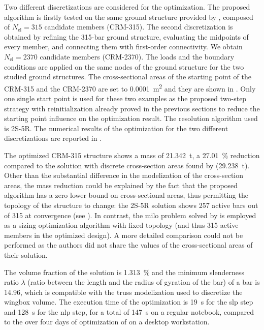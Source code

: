     Two different discretizations are considered for the optimization. The proposed algorithm is firstly tested on the same ground structure provided by \cite{fakhimi_discrete_2021}, composed of $N_{\text{el}}=315$ candidate members (CRM-315). The second discretization is obtained by refining the 315-bar ground structure, evaluating the midpoints of every member, and connecting them with first-order connectivity. We obtain $N_{\text{el}}=2370$ candidate members (CRM-2370). The loads and the boundary conditions are applied on the same nodes of the ground structure for the two studied ground structures. The cross-sectional areas of the starting point of the CRM-315 and the CRM-2370 are set to \qty{0.0001}{m^2} and they are shown in . Only one single start point is used for these two examples as the proposed two-step strategy with reinitialization already proved in the previous sections to reduce the starting point influence on the optimization result. The resolution algorithm used is 2S-5R. The numerical results of the optimization for the two different discretizations are reported in . 
    
    The optimized CRM-315 structure shows a mass of \qty{21.342}{\tonne}, a \qty{27.01}{\%} reduction compared to the solution with discrete cross-section areas found by \cite{fakhimi_discrete_2021}  (\qty{29.238}{\tonne}). Other than the substantial difference in the modelization of the cross-section areas, the mass reduction could be explained by the fact that the proposed algorithm has a zero lower bound on cross-sectional areas, thus permitting the topology of the structure to change: the 2S-5R solution shows 257 active bars out of 315 at convergence (see ). In contrast, the \gls{milo} problem solved by \cite{fakhimi_discrete_2021} is employed as a sizing optimization algorithm with fixed topology (and thus 315 active members in the optimized design). A more detailed comparison could not be performed as the authors did not share the values of the cross-sectional areas of their solution. 
    
    The volume fraction of the solution is \qty{1.313}{\percent} and the minimum slenderness ratio $\lambda$ (ratio between the length and the radius of gyration of the bar) of a bar is 14.96, which is compatible with the truss modelization used to discretize the wingbox volume. The execution time of the optimization is \qty{19}{s} for the \gls{slp} step and \qty{128}{s} for the \gls{nlp} step, for a total of \qty{147}{s} on a regular notebook, compared to the over four days of optimization of \cite{fakhimi_discrete_2021} on a desktop workstation. 

